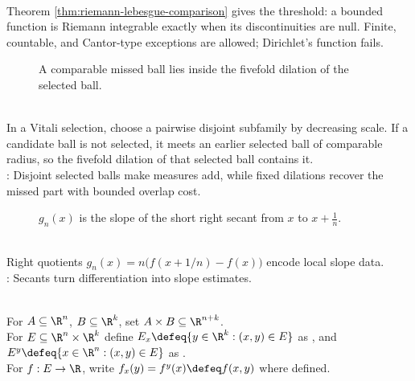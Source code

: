 \begin{perspective} \label{per:lebesgue-criterion-riemann-roadmap} \\
Theorem \ref{thm:riemann-lebesgue-comparison} gives the threshold: a bounded function is Riemann integrable exactly when its discontinuities are null. Finite, countable, and Cantor-type exceptions are allowed; Dirichlet's function fails.
\end{perspective}

\begin{figure}[H]
  \centering
  
  \caption{A comparable missed ball lies inside the fivefold dilation of the selected ball.}
  \label{fig:vitali-fivefold-dilation}
\end{figure}

\begin{perspective} \label{per:vitali-covering-fivefold-control} \\
In a Vitali selection, choose a pairwise disjoint subfamily by decreasing scale. If a candidate ball is not selected, it meets an earlier selected ball of comparable radius, so the fivefold dilation of that selected ball contains it.\\
: Disjoint selected balls make measures add, while fixed dilations recover the missed part with bounded overlap cost.
\end{perspective}

\begin{figure}[H]
  \centering
  
  \caption{$g_n(x)$ is the slope of the short right secant from $x$ to $x+\frac1n$.}
  \label{fig:lebesgue-right-secants}
\end{figure}

\begin{perspective} \label{per:lebesgue-right-secants} \\
Right quotients $g_n(x)=n\bigl(f(x+1/n)-f(x)\bigr)$ encode local slope data.\\
: Secants turn differentiation into slope estimates.
\end{perspective}

\begin{definition} \label{def:lebesgue-product-slices} \\
For $A\subseteq\R^n$, $B\subseteq\R^k$, set $A\times B\subseteq\R^{n+k}$.\\
For $E\subseteq\R^n\times\R^k$ define $E_x\defeq\{y\in\R^k:(x,y)\in E\}$ as , and  $E^y\defeq\{x\in\R^n:(x,y)\in E\}$ as .\\
For $f:E\to\R$, write $f_x(y)=f^y(x)\defeq f(x,y)$ where defined.
\end{definition}

